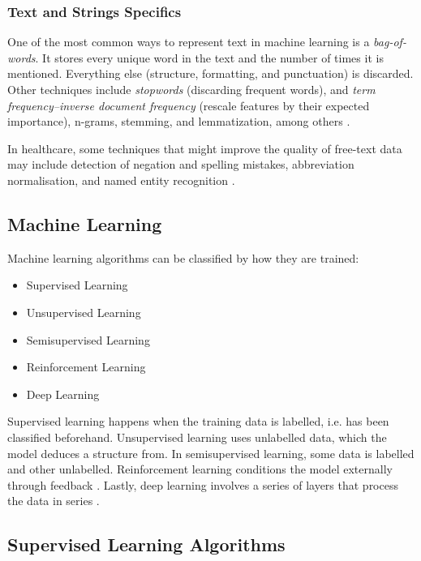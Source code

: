\documentclass[a4paper,12pt]{article}
\begin{document}
\subsubsection{Text and Strings Specifics}

One of the most common ways to represent text in machine learning is a
\textit{bag-of-words}.
It stores every unique word in the text and the number of times it is mentioned.
Everything else (structure, formatting, and punctuation) is discarded.
Other techniques include \textit{stopwords} (discarding frequent words),
and \textit{term frequency–inverse document frequency}
(rescale features by their expected importance), n-grams,
stemming, and lemmatization, among others \parencite[327,344]{Mueller2017}.

In healthcare, some techniques that might improve the quality of free-text data may include detection of negation and spelling mistakes, abbreviation normalisation, and named entity recognition \parencite{Dalianis2015}.

\subsection{Machine Learning}

Machine learning algorithms can be classified by how they are trained:

\begin{itemize}
 \item Supervised Learning
 \item Unsupervised Learning
 \item Semisupervised Learning
 \item Reinforcement Learning
 \item Deep Learning
\end{itemize}

Supervised learning happens when the training data is labelled,
i.e. has been classified beforehand.
Unsupervised learning uses unlabelled data, which the model deduces a structure from.
In semisupervised learning, some data is labelled and other unlabelled.
Reinforcement learning conditions the model externally through feedback
\parencite[11]{Ibrahim2021}.
Lastly, deep learning involves a series of layers that process the data in series \parencite[13]{Ibrahim2021}.

\subsection{Supervised Learning Algorithms}
\end{document}
